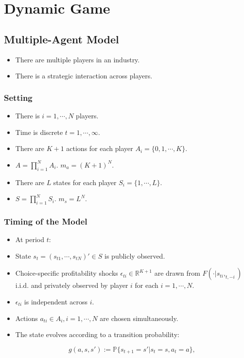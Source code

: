 \documentclass[]{book}
\providecommand{\tightlist}{%
  \setlength{\itemsep}{0pt}\setlength{\parskip}{0pt}}
\begin{document}
\chapter{Dynamic Game}\label{dynamicgame}

\section{Multiple-Agent Model}\label{multiple-agent-model}

\begin{itemize}
\tightlist
\item
  There are multiple players in an industry.
\item
  There is a strategic interaction across players.
\end{itemize}

\subsection{Setting}\label{setting-2}

\begin{itemize}
\tightlist
\item
  There is \(i = 1, \cdots, N\) players.
\item
  Time is discrete \(t = 1, \cdots, \infty\).
\item
  There are \(K + 1\) actions for each player
  \(A_i = \{0, 1, \cdots, K\}\).
\item
  \(A = \prod_{i = 1}^N A_i\). \(m_a = (K + 1)^N\).
\item
  There are \(L\) states for each player \(S_i = \{1, \cdots, L\}\).
\item
  \(S = \prod_{i = 1}^N S_i\). \(m_s = L^N\).
\end{itemize}

\subsection{Timing of the Model}\label{timing-of-the-model-1}

\begin{itemize}
\tightlist
\item
  At period \(t\):
\item
  State \(s_t = (s_{t1}, \cdots, s_{tN})' \in S\) is publicly observed.
\item
  Choice-specific profitability shocks
  \(\epsilon_{ti} \in \mathbb{R}^{K + 1}\) are drawn from
  \(F(\cdot|s_{ti}, _{t,-i})\) i.i.d. and privately observed by player
  \(i\) for each \(i = 1, \cdots, N\).
\item
  \(\epsilon_{ti}\) is independent across \(i\).
\item
  Actions \(a_{ti} \in A_i, i = 1, \cdots, N\) are chosen
  simultaneously.
\item
  The state evolves according to a transition probability:

  \begin{equation}
  g(a, s, s') := \mathbb{P}\{s_{t + 1} = s'|s_t = s, a_t = a\},
  \end{equation}
\end{itemize}
\end{document}
